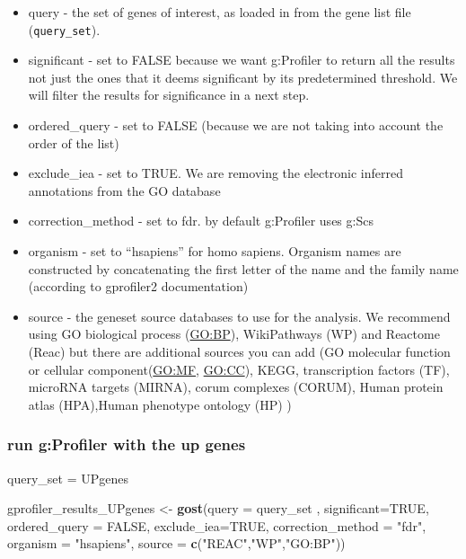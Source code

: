 \documentclass[
]{book}
\newenvironment{Shaded}{\begin{snugshade}}{\end{snugshade}}
\newcommand{\AttributeTok}[1]{\textcolor[rgb]{0.13,0.29,0.53}{#1}}
\newcommand{\ConstantTok}[1]{\textcolor[rgb]{0.56,0.35,0.01}{#1}}
\newcommand{\FunctionTok}[1]{\textcolor[rgb]{0.13,0.29,0.53}{\textbf{#1}}}
\newcommand{\NormalTok}[1]{#1}
\newcommand{\OtherTok}[1]{\textcolor[rgb]{0.56,0.35,0.01}{#1}}
\newcommand{\StringTok}[1]{\textcolor[rgb]{0.31,0.60,0.02}{#1}}
\providecommand{\tightlist}{%
  \setlength{\itemsep}{0pt}\setlength{\parskip}{0pt}}
\begin{document}
\begin{itemize}
\tightlist
\item
  query - the set of genes of interest, as loaded in from the gene list file (\texttt{query\_set}).
\item
  significant - set to FALSE because we want g:Profiler to return all the results not just the ones that it deems significant by its predetermined threshold. We will filter the results for significance in a next step.
\item
  ordered\_query - set to FALSE (because we are not taking into account the order of the list)
\item
  exclude\_iea - set to TRUE. We are removing the electronic inferred annotations from the GO database
\item
  correction\_method - set to fdr. by default g:Profiler uses g:Scs
\item
  organism - set to ``hsapiens'' for homo sapiens. Organism names are constructed by concatenating the first letter of the name and the family name (according to gprofiler2 documentation)
\item
  source - the geneset source databases to use for the analysis. We recommend using GO biological process (\url{GO:BP}), WikiPathways (WP) and Reactome (Reac) but there are additional sources you can add (GO molecular function or cellular component(\url{GO:MF}, \url{GO:CC}), KEGG, transcription factors (TF), microRNA targets (MIRNA), corum complexes (CORUM), Human protein atlas (HPA),Human phenotype ontology (HP) )
\end{itemize}

\subsubsection{run g:Profiler with the up genes}\label{run-gprofiler-with-the-up-genes}

\begin{Shaded}
\begin{Highlighting}[]
\NormalTok{query\_set }\OtherTok{=}\NormalTok{ UPgenes }

\NormalTok{gprofiler\_results\_UPgenes }\OtherTok{\textless{}{-}} \FunctionTok{gost}\NormalTok{(}\AttributeTok{query =}\NormalTok{ query\_set ,}
                          \AttributeTok{significant=}\ConstantTok{TRUE}\NormalTok{,}
                          \AttributeTok{ordered\_query =} \ConstantTok{FALSE}\NormalTok{,}
                          \AttributeTok{exclude\_iea=}\ConstantTok{TRUE}\NormalTok{,}
                          \AttributeTok{correction\_method =} \StringTok{"fdr"}\NormalTok{,}
                          \AttributeTok{organism =} \StringTok{"hsapiens"}\NormalTok{,}
                          \AttributeTok{source =} \FunctionTok{c}\NormalTok{(}\StringTok{"REAC"}\NormalTok{,}\StringTok{"WP"}\NormalTok{,}\StringTok{"GO:BP"}\NormalTok{))}
\end{Highlighting}
\end{Shaded}
\end{document}

